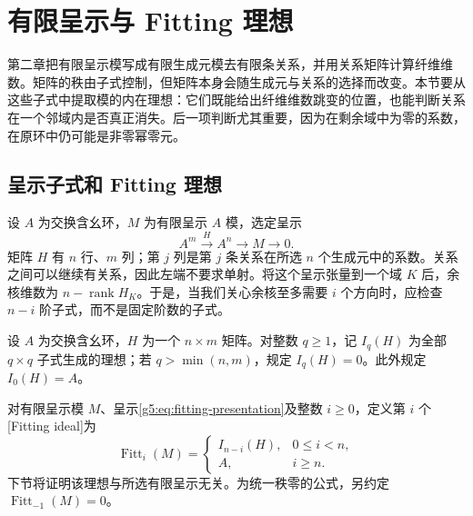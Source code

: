 
% 
% 

\section{有限呈示与 Fitting 理想}
\label{g5:sec:0602}

第二章把有限呈示模写成有限生成元模去有限条关系，并用关系矩阵计算纤维维数。矩阵的秩由子式控制，但矩阵本身会随生成元与关系的选择而改变。本节要从这些子式中提取模的内在理想：它们既能给出纤维维数跳变的位置，也能判断关系在一个邻域内是否真正消失。后一项判断尤其重要，因为在剩余域中为零的系数，在原环中仍可能是非零幂零元。

\subsection{呈示子式和 Fitting 理想}
\label{g5:subsec:0602:01}

设 \(A\) 为交换含幺环，\(M\) 为有限呈示 \(A\) 模，选定呈示
\begin{equation}\label{g5:eq:fitting-presentation}
	A^m\xrightarrow{H}A^n\longrightarrow M\longrightarrow0.
\end{equation}
矩阵 \(H\) 有 \(n\) 行、\(m\) 列；第 \(j\) 列是第 \(j\) 条关系在所选 \(n\) 个生成元中的系数。关系之间可以继续有关系，因此左端不要求单射。将这个呈示张量到一个域 \(K\) 后，余核维数为 \(n-\operatorname{rank}H_K\)。于是，当我们关心余核至多需要 \(i\) 个方向时，应检查 \(n-i\) 阶子式，而不是固定阶数的子式。

\begin{definition}\label{g5:def:fitting-ideal}
	设 \(A\) 为交换含幺环，\(H\) 为一个 \(n\times m\) 矩阵。对整数 \(q\geq1\)，记 \(I_q(H)\) 为全部 \(q\times q\) 子式生成的理想；若 \(q>\min(n,m)\)，规定 \(I_q(H)=0\)。此外规定 \(I_0(H)=A\)。

	对有限呈示模 \(M\)、呈示\eqref{g5:eq:fitting-presentation}及整数 \(i\geq0\)，定义第 \(i\) 个[Fitting ideal]为
	\[
		\operatorname{Fitt}_i(M)=
		\begin{cases}
			I_{n-i}(H),&0\leq i<n,\\
			A,&i\geq n.
		\end{cases}
	\]
	下节将证明该理想与所选有限呈示无关。为统一秩零的公式，另约定 \(\operatorname{Fitt}_{-1}(M)=0\)。
\end{definition}

